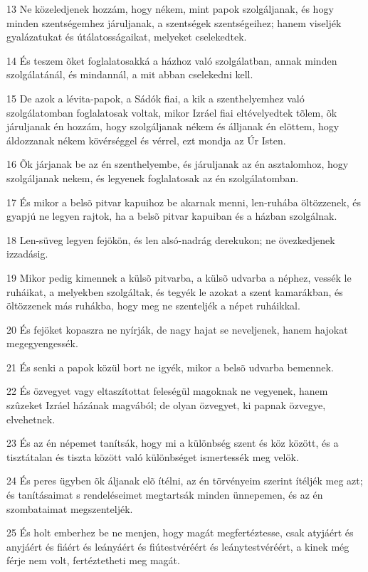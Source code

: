 \par 13 Ne közeledjenek hozzám, hogy nékem, mint papok szolgáljanak, és hogy minden szentségemhez járuljanak, a szentségek szentségeihez; hanem viseljék gyalázatukat és útálatosságaikat, melyeket cselekedtek.
\par 14 És teszem õket foglalatosakká a házhoz való szolgálatban, annak minden szolgálatánál, és mindannál, a mit abban cselekedni kell.
\par 15 De azok a lévita-papok, a Sádók fiai, a kik a szenthelyemhez való szolgálatomban foglalatosak voltak, mikor Izráel fiai eltévelyedtek tõlem, õk járuljanak én hozzám, hogy szolgáljanak nékem és álljanak én elõttem, hogy áldozzanak nékem kövérséggel és vérrel, ezt mondja az Úr Isten.
\par 16 Õk járjanak be az én szenthelyembe, és járuljanak az én asztalomhoz, hogy szolgáljanak nekem, és legyenek foglalatosak az én szolgálatomban.
\par 17 És mikor a belsõ pitvar kapuihoz be akarnak menni, len-ruhába öltözzenek, és gyapjú ne legyen rajtok, ha a belsõ pitvar kapuiban és a házban szolgálnak.
\par 18 Len-süveg legyen fejökön, és len alsó-nadrág derekukon; ne övezkedjenek izzadásig.
\par 19 Mikor pedig kimennek a külsõ pitvarba, a külsõ udvarba a néphez, vessék le ruháikat, a melyekben szolgáltak, és tegyék le azokat a szent kamarákban, és öltözzenek más ruhákba, hogy meg ne szenteljék a népet ruháikkal.
\par 20 És fejöket kopaszra ne nyírják, de nagy hajat se neveljenek, hanem hajokat megegyengessék.
\par 21 És senki a papok közül bort ne igyék, mikor a belsõ udvarba bemennek.
\par 22 És özvegyet vagy eltaszítottat feleségül magoknak ne vegyenek, hanem szûzeket Izráel házának magvából; de olyan özvegyet, ki papnak özvegye, elvehetnek.
\par 23 És az én népemet tanítsák, hogy mi a különbség szent és köz között, és a tisztátalan és tiszta között való különbséget ismertessék meg velök.
\par 24 És peres ügyben õk áljanak elõ ítélni, az én törvényeim szerint ítéljék meg azt; és tanításaimat s rendeléseimet megtartsák minden ünnepemen, és az én szombataimat megszenteljék.
\par 25 És holt emberhez be ne menjen, hogy magát megfertéztesse, csak atyjáért és anyjáért és fiáért és leányáért és fiútestvéréért és leánytestvéréért, a kinek még férje nem volt, fertéztetheti meg magát.
